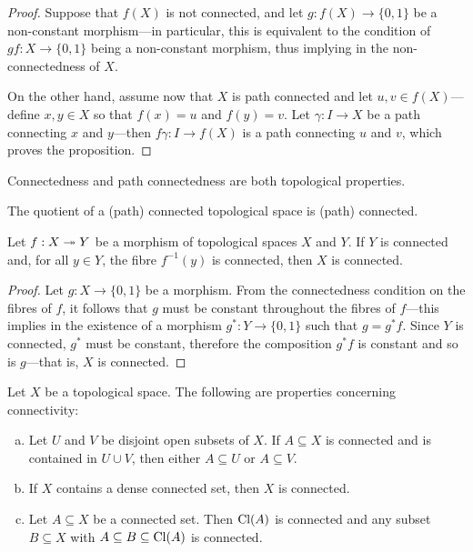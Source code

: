 \begin{proof}
Suppose that \(f(X)\) is not connected, and let \(g: f(X) \to \{0, 1\}\) be a
non-constant morphism---in particular, this is equivalent to the condition of
\(gf: X \to \{0, 1\}\) being a non-constant morphism, thus implying in the
non-connectedness of \(X\).

On the other hand, assume now that \(X\) is path connected and let
\(u, v \in f(X)\)---define \(x, y \in X\) so that \(f(x) = u\) and \(f(y) = v\). Let
\(\gamma: I \to X\) be a path connecting \(x\) and \(y\)---then
\(f\gamma: I \to f(X)\) is a path connecting \(u\) and \(v\), which proves the
proposition.
\end{proof}

\begin{corollary}
\label{cor:connectedness-top-property}
Connectedness and path connectedness are both topological properties.
\end{corollary}

\begin{corollary}
\label{cor:quotient-path-connected-is-path-connected}
The quotient of a (path) connected topological space is (path) connected.
\end{corollary}

\begin{proposition}
\label{prop:connectivity-quotients}
Let \(f: X \twoheadrightarrow Y\) be a morphism of topological spaces \(X\) and \(Y\). If
\(Y\) is connected and, for all \(y \in Y\), the fibre \(f^{-1}(y)\) is
connected, then \(X\) is connected.
\end{proposition}

\begin{proof}
Let \(g: X \to \{0, 1\}\) be a morphism. From the connectedness condition on the
fibres of \(f\), it follows that \(g\) must be constant throughout the fibres of
\(f\)---this implies in the existence of a morphism \(g^{*}: Y \to \{0, 1\}\)
such that \(g = g^{*} f\). Since \(Y\) is connected, \(g^{*}\) must be constant,
therefore the composition \(g^{*} f\) is constant and so is \(g\)---that is,
\(X\) is connected.
\end{proof}

\begin{proposition}
\label{prop:properties-connectivity}
Let \(X\) be a topological space. The following are properties concerning
connectivity:
\begin{enumerate}[(a)]\setlength\itemsep{0em}
\item Let \(U\) and \(V\) be disjoint open subsets of \(X\). If
  \(A \subseteq X\) is connected and is contained in \(U \cup V\), then either
  \(A \subseteq U\) or \(A \subseteq V\).

\item If \(X\) contains a dense connected set, then \(X\) is connected.

\item Let \(A \subseteq X\) be a connected set. Then \(\operatorname{Cl}(A)\) is connected and
  any subset \(B \subseteq X\) with \(A \subseteq B \subseteq \operatorname{Cl}(A)\) is
  connected.
\end{enumerate}
\end{proposition}

